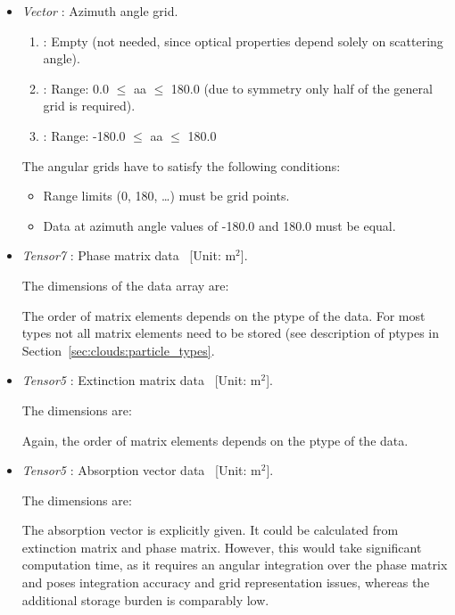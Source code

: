 \begin{itemize}
\item {\sl Vector} : Azimuth angle grid.
  \begin{enumerate}
  \item {}:
    Empty (not needed, since optical properties depend solely on scattering
    angle).
  \item {}:
    Range: 0.0\degree{} $\le$ aa $\le$ 180.0\degree{} (due to symmetry only half of
    the general grid is required).
  \item {}: Range: -180.0\degree{} $\le$ aa $\le$ 180.0\degree{}
  \end{enumerate}
  
  The angular grids have to satisfy the following conditions:
  \begin{itemize}
  \item Range limits (0\degree{}, 180\degree{}, \dots) must be grid points.
  \item Data at azimuth angle values of -180.0\degree{} and 180.0\degree{} must be equal.
  \end{itemize}
  
\item {\sl Tensor7} :
  Phase matrix data \EnsAvr\PhaMat\ [Unit: m$^2$].

  The dimensions of the data array are:  
  
  
  The order of matrix elements depends on the ptype of the data. For most types
  not all matrix elements need to be stored (see description of ptypes in
  Section~\ref{sec:clouds:particle_types}.

\item {\sl Tensor5} :
  Extinction matrix data \EnsAvr\ExtMat\ [Unit: m$^2$].

  The dimensions are: 

  
  Again, the order of matrix elements depends on the ptype of the data.

\item {\sl Tensor5} :
  Absorption vector data \EnsAvr\AbsVec\ [Unit: m$^2$]. 
  
  The dimensions are: 
  

  The absorption vector is explicitly given. It could be calculated
  from extinction matrix and phase matrix. However, this would take
  significant computation time, as it requires an angular integration over
  the phase matrix and poses integration accuracy and grid representation
  issues, whereas the additional storage burden is comparably low.
\end{itemize}

